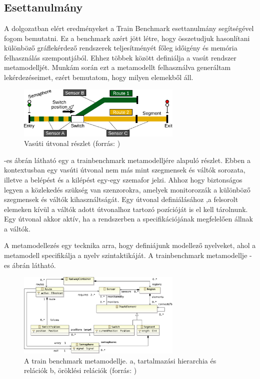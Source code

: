 \chapter{\eloismeretek}

\section{Esettanulmány}
A dolgozatban elért eredményeket a Train Benchmark \cite{szarnyas2018train} esettanulmány segítségével fogom bemutatni. Ez a benchmark azért jött létre, hogy összetudjuk hasonlítani különböző gráflekérdező rendszerek teljesítményét főleg időigény és memória felhasználás szempontjából. Ehhez többek között definiálja a vasút rendszer metamodelljét. Munkám során ezt a metamodellt felhasználva generáltam lekérdezéseimet, ezért bemutatom, hogy milyen elemekből áll. 

\begin{figure}
	\centering
	\includegraphics[width=0.7\textwidth]{figures/trainbenchmarkfig1}
	\caption{Vasúti útvonal részlet (forrás: \cite{szarnyas2018train})}
	\label{fig:trainbenchmark}
\end{figure}

 -es ábrán látható egy a trainbenchmark metamodelljére alapuló részlet. Ebben a kontextusban egy vasúti útvonal nem más mint szegmensek és váltók sorozata, illetve a belépést és a kilépést egy-egy szemafor jelzi. Ahhoz hogy biztonságos legyen a közlekedés szükség van szenzorokra, amelyek monitorozzák a különböző szegmensek és váltók kihasználtságát. Egy útvonal definiálásához ,a felsorolt elemeken kívül a váltók adott útvonalhoz tartozó pozícióját is el kell tárolnunk. Egy útvonal akkor aktív, ha a rendszerben a specifikációjának megfelelően állnak a váltók.

A metamodellezés egy tecknika arra, hogy definiájunk modellező nyelveket, ahol a metamodell specifikálja a nyelv szintaktikáját. A trainbenchmark metamodellje  -es ábrán látható.

\begin{figure}
	\centering
	\includegraphics[width=0.7\textwidth]{figures/trainbenchmarkfig2}
	\caption{A train benchmark metamodellje. a, tartalmazási hierarchia és relációk b, öröklési relációk (forrás: \cite{szarnyas2018train})}
	\label{fig:trainbenchmarkmetamodell}
\end{figure}


